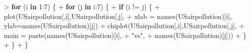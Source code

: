 \documentclass[
]{article}
\newenvironment{Shaded}{\begin{snugshade}}{\end{snugshade}}
\newcommand{\AttributeTok}[1]{\textcolor[rgb]{0.77,0.63,0.00}{#1}}
\newcommand{\ControlFlowTok}[1]{\textcolor[rgb]{0.13,0.29,0.53}{\textbf{#1}}}
\newcommand{\DecValTok}[1]{\textcolor[rgb]{0.00,0.00,0.81}{#1}}
\newcommand{\FunctionTok}[1]{\textcolor[rgb]{0.00,0.00,0.00}{#1}}
\newcommand{\NormalTok}[1]{#1}
\newcommand{\SpecialCharTok}[1]{\textcolor[rgb]{0.00,0.00,0.00}{#1}}
\newcommand{\StringTok}[1]{\textcolor[rgb]{0.31,0.60,0.02}{#1}}
\begin{document}
\begin{Shaded}
\begin{Highlighting}[]
\SpecialCharTok{\textgreater{}} \ControlFlowTok{for}\NormalTok{ (i }\ControlFlowTok{in} \DecValTok{1}\SpecialCharTok{:}\DecValTok{7}\NormalTok{) \{}
\SpecialCharTok{+}   \ControlFlowTok{for}\NormalTok{ (j }\ControlFlowTok{in}\NormalTok{ i}\SpecialCharTok{:}\DecValTok{7}\NormalTok{) \{}
\SpecialCharTok{+}     \ControlFlowTok{if}\NormalTok{ (i }\SpecialCharTok{!=}\NormalTok{ j) \{}
\SpecialCharTok{+}       \FunctionTok{plot}\NormalTok{(USairpollution[,i],USairpollution[,j],}
\SpecialCharTok{+}            \AttributeTok{xlab =} \FunctionTok{names}\NormalTok{(USairpollution)[i], }\AttributeTok{ylab=}\FunctionTok{names}\NormalTok{(USairpollution)[j])}
\SpecialCharTok{+}       \FunctionTok{chiplot}\NormalTok{(USairpollution[,i],USairpollution[,j],}
\SpecialCharTok{+}               \AttributeTok{main =} \FunctionTok{paste}\NormalTok{(}\FunctionTok{names}\NormalTok{(USairpollution)[i],}
\SpecialCharTok{+}                            \StringTok{"vs"}\NormalTok{, }
\SpecialCharTok{+}                            \FunctionTok{names}\NormalTok{(USairpollution)[j]))}
\SpecialCharTok{+}\NormalTok{     \} }
\SpecialCharTok{+}\NormalTok{   \}}
\SpecialCharTok{+}\NormalTok{ \}}
\end{Highlighting}
\end{Shaded}
\end{document}
